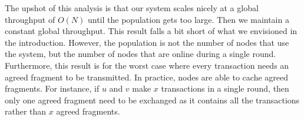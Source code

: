 The upshot of this analysis is that our system scales nicely at a global throughput of $O(N)$ until the population gets too large.
Then we maintain a constant global throughput.
This result falls a bit short of what we envisioned in the introduction.
However, the population is not the number of nodes that use the system, but the number of nodes that are online during a single round.
Furthermore, this result is for the worst case where every transaction needs an agreed fragment to be transmitted.
In practice, nodes are able to cache agreed fragments.
For instance, if $u$ and $v$ make $x$ transactions in a single round,
then only one agreed fragment need to be exchanged as it contains all the transactions rather than $x$ agreed fragments.
